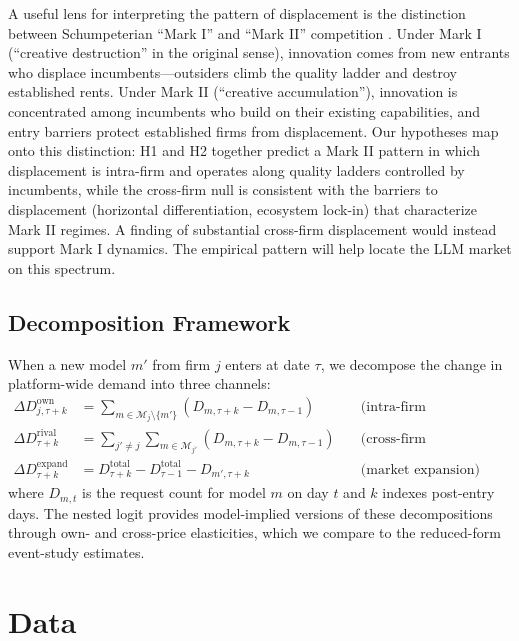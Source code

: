 \documentclass[11pt, a4paper]{article}
\begin{document}
A useful lens for interpreting the pattern of displacement is the distinction between Schumpeterian ``Mark I'' and ``Mark II'' competition \citep{aghion1992model, aghion2005competition}. Under Mark I (``creative destruction'' in the original sense), innovation comes from new entrants who displace incumbents---outsiders climb the quality ladder and destroy established rents. Under Mark II (``creative accumulation''), innovation is concentrated among incumbents who build on their existing capabilities, and entry barriers protect established firms from displacement. Our hypotheses map onto this distinction: H1 and H2 together predict a Mark II pattern in which displacement is intra-firm and operates along quality ladders controlled by incumbents, while the cross-firm null is consistent with the barriers to displacement (horizontal differentiation, ecosystem lock-in) that characterize Mark II regimes. A finding of substantial cross-firm displacement would instead support Mark I dynamics. The empirical pattern will help locate the LLM market on this spectrum.

\subsection{Decomposition Framework}

When a new model $m'$ from firm $j$ enters at date $\tau$, we decompose the change in platform-wide demand into three channels:
\begin{align}
\Delta D^{\text{own}}_{j,\tau+k} &= \sum_{m \in \mathcal{M}_j \setminus \{m'\}} \left( D_{m,\tau+k} - D_{m,\tau-1} \right) \quad &\text{(intra-firm cannibalization)} \label{eq:own} \\
\Delta D^{\text{rival}}_{\tau+k} &= \sum_{j' \neq j} \sum_{m \in \mathcal{M}_{j'}} \left( D_{m,\tau+k} - D_{m,\tau-1} \right) \quad &\text{(cross-firm displacement)} \label{eq:rival} \\
\Delta D^{\text{expand}}_{\tau+k} &= D^{\text{total}}_{\tau+k} - D^{\text{total}}_{\tau-1} - D_{m',\tau+k} \quad &\text{(market expansion)} \label{eq:expand}
\end{align}
where $D_{m,t}$ is the request count for model $m$ on day $t$ and $k$ indexes post-entry days. The nested logit provides model-implied versions of these decompositions through own- and cross-price elasticities, which we compare to the reduced-form event-study estimates.

\section{Data}
\label{sec:data}
\end{document}
